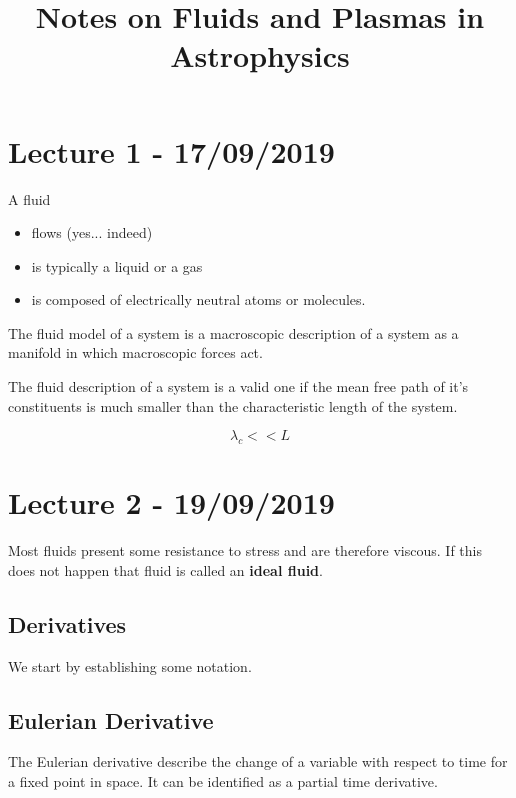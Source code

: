 \documentclass{article}
\begin{document}
\title{Notes on Fluids and Plasmas in Astrophysics}
\date{}
\maketitle


\section{Lecture 1 - 17/09/2019}

A fluid

\begin{itemize}
\item flows (yes... indeed)
\item is typically a liquid or a gas
\item is composed of electrically neutral atoms or molecules. 
\end{itemize}

The fluid model of a system is a macroscopic description of a system as a
manifold in which macroscopic forces act.

The fluid description of a system is a valid one if the mean free path of it's
constituents is much smaller than the characteristic length of the system.

\begin{equation*}
  \lambda_c << L
\end{equation*}

\section{Lecture 2 - 19/09/2019}

Most fluids present some resistance to stress and are therefore viscous. If this
does not happen that fluid is called an \textbf{ideal fluid}.

\subsection{Derivatives}

We start by establishing some notation.


\subsection{Eulerian Derivative}

The Eulerian derivative describe the change of a variable with respect to time
for a fixed point in space. It can be identified as a partial time derivative.
\end{document}
